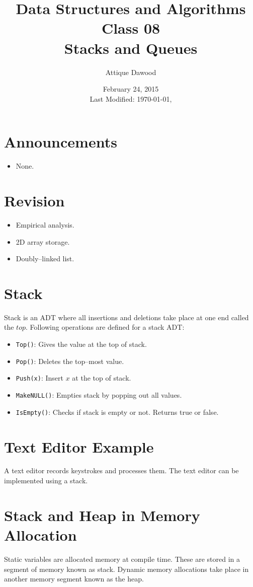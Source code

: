 \documentclass[12pt,a4paper]{article}
\title{Data Structures and Algorithms\\Class 08\\Stacks and Queues}
\author{Attique Dawood}
\date{February 24, 2015\\[0.2cm] Last Modified: \today, \currenttime}
\begin{document}
\maketitle
\section{Announcements}
\begin{itemize}
\item None.
\end{itemize}
\section{Revision}
\begin{itemize}
\item Empirical analysis.
\item 2D array storage.
\item Doubly--linked list.
\end{itemize}
\section{Stack~\cite[Sec. 2.3]{Aho}}
Stack is an ADT where all insertions and deletions take place at one end called the $top$. Following operations are defined for a stack ADT:
\begin{itemize}
\item \verb|Top()|: Gives the value at the top of stack.
\item \verb|Pop()|: Deletes the top--most value.
\item \verb|Push(x)|: Insert $x$ at the top of stack.
\item \verb|MakeNULL()|: Empties stack by popping out all values.
\item \verb|IsEmpty()|: Checks if stack is empty or not. Returns true or false.
\end{itemize}
\section{Text Editor Example}
A text editor records keystrokes and processes them. The text editor can be implemented using a stack.
\section{Stack and Heap in Memory Allocation}
Static variables are allocated memory at compile time. These are stored in a segment of memory known as stack. Dynamic memory allocations take place in another memory segment known as the heap.


\end{document}
